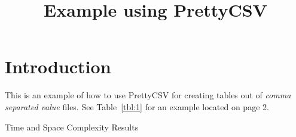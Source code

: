 \documentclass[conference]{IEEEtran}
\renewcommand{\arraystretch}{1.1}
\begin{document}
\title{Example using PrettyCSV}

\author{
}

\maketitle

\section{Introduction}

This is an example of how to use PrettyCSV for creating tables out of {\em comma separated value} files.
See Table~\ref{tbl:1} for an example located on page 2.

\begin{table*}[h]
\renewcommand{\arraystretch}{1.3}
\caption{Time and Space Complexity Results}
\label{tbl:1}
\centering
\footnotesize
{}
\normalsize
\end{table*}


\end{document}
